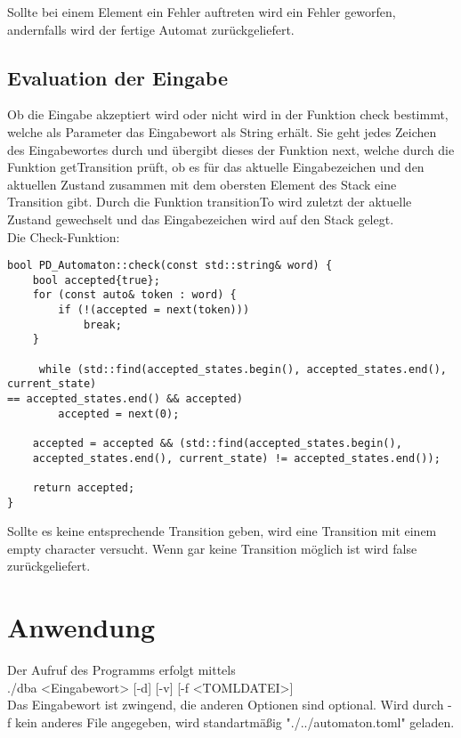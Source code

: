 \documentclass[12pt,a4paper]{article}
\begin{document}
\medskip
Sollte bei einem Element ein Fehler auftreten wird ein Fehler geworfen, andernfalls wird der fertige Automat zurückgeliefert.

\subsection{Evaluation der Eingabe}
Ob die Eingabe akzeptiert wird oder nicht wird in der Funktion check bestimmt, welche als Parameter das Eingabewort als String erhält. Sie geht jedes Zeichen des Eingabewortes durch und übergibt dieses der Funktion next, welche durch die Funktion getTransition prüft, ob es für das aktuelle Eingabezeichen und den aktuellen Zustand zusammen mit dem obersten Element des Stack eine Transition gibt. Durch die Funktion transitionTo wird zuletzt der aktuelle Zustand gewechselt und das Eingabezeichen wird auf den Stack gelegt.
\\
Die Check-Funktion:

\begin{lstlisting}
bool PD_Automaton::check(const std::string& word) {
    bool accepted{true};
    for (const auto& token : word) {
        if (!(accepted = next(token)))
            break;
    }

     while (std::find(accepted_states.begin(), accepted_states.end(), current_state) 
== accepted_states.end() && accepted)
        accepted = next(0);

    accepted = accepted && (std::find(accepted_states.begin(), 
    accepted_states.end(), current_state) != accepted_states.end());

    return accepted;
}
\end{lstlisting}
\medskip
Sollte es keine entsprechende Transition geben, wird eine Transition mit einem empty character versucht. Wenn gar keine Transition möglich ist wird false zurückgeliefert.


\section{Anwendung}
Der Aufruf des Programms erfolgt mittels
\\
\medskip
 ./dba <Eingabewort> [-d] [-v] [-f <TOMLDATEI>]
\\
\bigskip
Das Eingabewort ist zwingend, die anderen Optionen sind optional. Wird durch -f kein anderes File angegeben, wird standartmäßig "./../automaton.toml" geladen.
\end{document}

